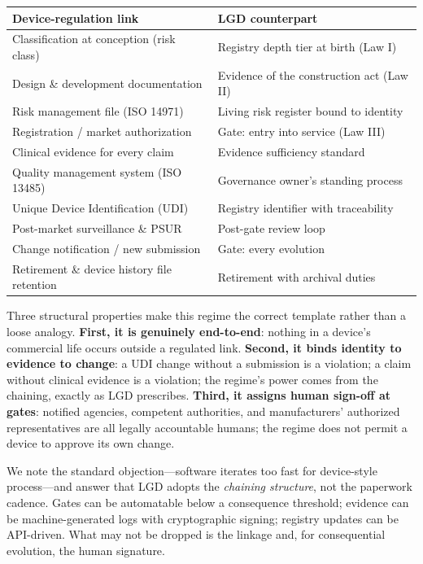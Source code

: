\documentclass[12pt]{article}
\begin{document}
\begin{center}
\begin{tabular}{@{}p{}p{}@{}}
\toprule
\textbf{Device-regulation link} & \textbf{LGD counterpart} \\
\midrule
Classification at conception (risk class) & Registry depth tier at birth (Law I) \\
Design \& development documentation & Evidence of the construction act (Law II) \\
Risk management file (ISO 14971) & Living risk register bound to identity \\
Registration / market authorization & Gate: entry into service (Law III) \\
Clinical evidence for every claim & Evidence sufficiency standard \\
Quality management system (ISO 13485) & Governance owner's standing process \\
Unique Device Identification (UDI) & Registry identifier with traceability \\
Post-market surveillance \& PSUR & Post-gate review loop \\
Change notification / new submission & Gate: every evolution \\
Retirement \& device history file retention & Retirement with archival duties \\
\bottomrule
\end{tabular}
\end{center}

Three structural properties make this regime the correct template rather than a loose analogy. \textbf{First, it is genuinely end-to-end}: nothing in a device's commercial life occurs outside a regulated link. \textbf{Second, it binds identity to evidence to change}: a UDI change without a submission is a violation; a claim without clinical evidence is a violation; the regime's power comes from the chaining, exactly as LGD prescribes. \textbf{Third, it assigns human sign-off at gates}: notified agencies, competent authorities, and manufacturers' authorized representatives are all legally accountable humans; the regime does not permit a device to approve its own change.

We note the standard objection---software iterates too fast for device-style process---and answer that LGD adopts the \emph{chaining structure}, not the paperwork cadence. Gates can be automatable below a consequence threshold; evidence can be machine-generated logs with cryptographic signing; registry updates can be API-driven. What may not be dropped is the linkage and, for consequential evolution, the human signature.
\end{document}
